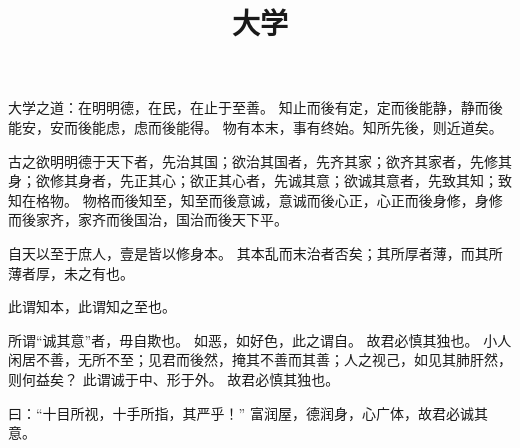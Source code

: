\documentclass[twoside,openany]{book}
\title{大学}
\author{\xpinyin{曾}{zeng1}\xpinyin{参}{shen1}}
\date{}
\begin{document}
\maketitle
	
\noindent
	
	
\begin{pinyinscope}
大学之道：在明明德，在民，在止于至善。
知止而後有定，定而後能静，静而後能安，安而後能虑，虑而後能得。
物有本末，事有终始。知所先後，则近道矣。

古之欲明明德于天下者，先治其国；欲治其国者，先齐其家；欲齐其家者，先修其身；欲修其身者，先正其心；欲正其心者，先诚其意；欲诚其意者，先致其知；致知在格物。
物格而後知至，知至而後意诚，意诚而後心正，心正而後身修，身修而後家齐，家齐而後国治，国治而後天下平。

自天以至于庶人，壹是皆以修身本。
其本乱而末治者否矣；其所厚者薄，而其所薄者厚，未之有也。

此谓知本，此谓知之至也。

所谓“诚其意”者，毋自欺也。
如恶，如好色，此之谓自。
故君必慎其独也。
小人闲居不善，无所不至；见君而後然，掩其不善而其善；人之视己，如见其肺肝然，则何益矣？
此谓诚于中、形于外。
故君必慎其独也。

曰：“十目所视，十手所指，其严乎！”
富润屋，德润身，心广体，故君必诚其意。


\end{pinyinscope}
\end{document}
